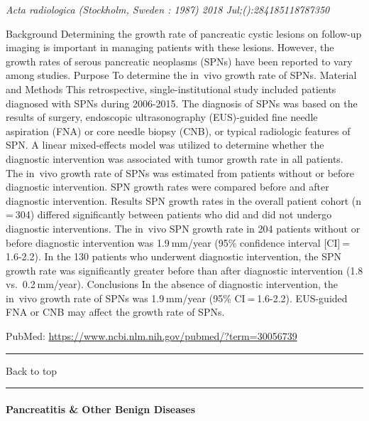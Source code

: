 \documentclass[]{article}
\let\oldparagraph\paragraph
\renewcommand{\paragraph}[1]{\oldparagraph{#1}\mbox{}}
\begin{document}
\emph{Acta radiologica (Stockholm, Sweden : 1987) 2018
Jul;():284185118787350}

Background Determining the growth rate of pancreatic cystic lesions on
follow-up imaging is important in managing patients with these lesions.
However, the growth rates of serous pancreatic neoplasms (SPNs) have
been reported to vary among studies. Purpose To determine the in~vivo
growth rate of SPNs. Material and Methods This retrospective,
single-institutional study included patients diagnosed with SPNs during
2006-2015. The diagnosis of SPNs was based on the results of surgery,
endoscopic ultrasonography (EUS)-guided fine needle aspiration (FNA) or
core needle biopsy (CNB), or typical radiologic features of SPN. A
linear mixed-effects model was utilized to determine whether the
diagnostic intervention was associated with tumor growth rate in all
patients. The in~vivo growth rate of SPNs was estimated from patients
without or before diagnostic intervention. SPN growth rates were
compared before and after diagnostic intervention. Results SPN growth
rates in the overall patient cohort (n = 304) differed significantly
between patients who did and did not undergo diagnostic interventions.
The in~vivo SPN growth rate in 204 patients without or before diagnostic
intervention was 1.9 mm/year (95\% confidence interval
{[}CI{]} = 1.6-2.2). In the 130 patients who underwent diagnostic
intervention, the SPN growth rate was significantly greater before than
after diagnostic intervention (1.8 vs.~0.2 mm/year). Conclusions In the
absence of diagnostic intervention, the in~vivo growth rate of SPNs was
1.9 mm/year (95\% CI = 1.6-2.2). EUS-guided FNA or CNB may affect the
growth rate of SPNs.

PubMed: \url{https://www.ncbi.nlm.nih.gov/pubmed/?term=30056739}

{}

{}

\begin{center}\rule{0.5\linewidth}{\linethickness}\end{center}

Back to top

\begin{center}\rule{0.5\linewidth}{\linethickness}\end{center}

\pagebreak

\hypertarget{pancreatitis-other-benign-diseases}{%
\paragraph{Pancreatitis \& Other Benign
Diseases}\label{pancreatitis-other-benign-diseases}}
\end{document}
